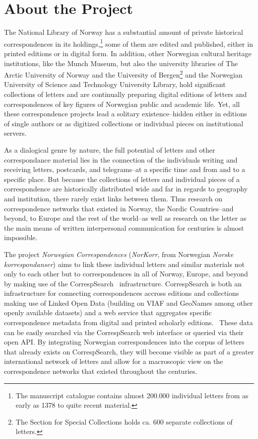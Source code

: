 \documentclass[runningheads]{llncs}
\begin{document}
\section{About the Project}
The National Library of Norway has a substantial amount of private
historical correspondences in its
holdings,\footnote{The manuscript catalogue contains almost 200.000 individual letters from as early as 1378 to quite recent material.} some of them are edited and published, either in printed editions or in digital form. In
addition, other Norwegian cultural heritage institutions, like the Munch
Museum, but also the university
libraries of The Arctic University of
Norway and the University of
Bergen\footnote{The Section for Special Collections holds
ca. 600 separate collections of letters.} and the Norwegian University of Science and
Technology University Library, hold significant
collections of letters and are continually preparing digital editions of letters and
correspondences of key figures of Norwegian public and academic life.
Yet, all these correspondence projects lead a solitary existence--hidden
either in editions of single authors or as digitized collections or
individual pieces on institutional servers.

As a dialogical genre by nature, the full potential of letters and other correspondance material lies in the connection of the individuals writing and receiving letters, postcards, and telegrams--at a specific time and from and to a specific place. But because the collections of letters and individual pieces of a correspondence are historically
distributed wide and far in regards to geography and institution, there rarely exist links between them. Thus research on correspondence
networks that existed in Norway, the Nordic Countries--and beyond, to Europe and the rest of the world--as well as research on the letter as the main means of written interpersonal communication for centuries is almost
impossible.

The project \textit{Norwegian Correspondences} (\textit{NorKorr}, from Norwegian \textit{Norske korrespondanser}) aims to link these individual letters and similar materials not only to each other but to correspondences in
all of Norway, Europe, and beyond by making use of the CorrespSearch~\cite{ref_url9}
infrastructure. CorrespSearch is both an infrastructure for connecting correspondences accross editions and collections making use of Linked Open Data (building on VIAF and GeoNames among other openly available datasets) and a web service that aggregates specific correspondence
metadata from digital and printed scholarly
editions.~\cite{ref_article} These data can be easily
searched via the CorrespSearch web interface or queried via their open API. By integrating Norwegian correspondences into the corpus of letters that already exists on CorrespSearch, they will become visible as part of a greater international network of letters and allow for a
macroscopic view on the correspondence networks that existed throughout the centuries.
\end{document}
